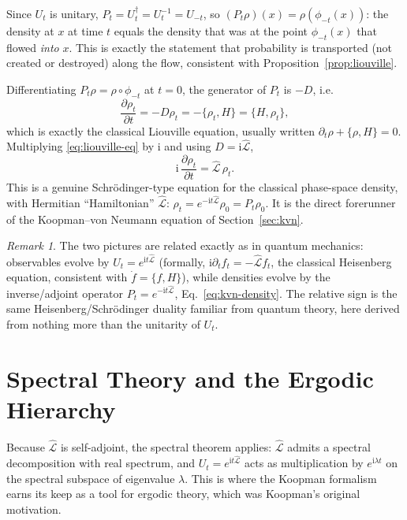 \documentclass[11pt]{article}
\theoremstyle{remark}
\newtheorem{remark}[proposition]{Remark}
\newcommand{\PB}[2]{\{#1,#2\}}
\newcommand{\CL}{\widehat{\mathcal{L}}}
\newcommand{\ii}{\mathrm{i}}
\begin{document}
Since $U_t$ is unitary, $P_t = U_t^\dagger = U_t^{-1}=U_{-t}$, so $(P_t\rho)(x) = \rho(\phi_{-t}(x))$: the density at $x$ at time $t$ equals the density that was at the point $\phi_{-t}(x)$ that flowed \emph{into} $x$. This is exactly the statement that probability is transported (not created or destroyed) along the flow, consistent with Proposition~\ref{prop:liouville}.

Differentiating $P_t\rho = \rho\circ\phi_{-t}$ at $t=0$, the generator of $P_t$ is $-D$, i.e.
\begin{equation}
\frac{\partial \rho_t}{\partial t} = -D\rho_t = -\PB{\rho_t}{H} = \PB{H}{\rho_t},
\label{eq:liouville-eq}
\end{equation}
which is exactly the classical Liouville equation, usually written $\partial_t\rho+\PB{\rho}{H}=0$. Multiplying \eqref{eq:liouville-eq} by $\ii$ and using $D=\ii\CL$,
\begin{equation}
\boxed{\ \ii\,\frac{\partial \rho_t}{\partial t} = \CL\,\rho_t. \ }
\label{eq:kvn-density}
\end{equation}
This is a genuine Schr\"odinger-type equation for the classical phase-space density, with Hermitian ``Hamiltonian'' $\CL$: $\rho_t = e^{-\ii t \CL}\rho_0 = P_t\rho_0$. It is the direct forerunner of the Koopman--von Neumann equation of Section~\ref{sec:kvn}.

\begin{remark}
The two pictures are related exactly as in quantum mechanics: observables evolve by $U_t=e^{\ii t\CL}$ (formally, $\ii\partial_tf_t = -\CL f_t$, the classical Heisenberg equation, consistent with $\dot f=\PB{f}{H}$), while densities evolve by the inverse/adjoint operator $P_t=e^{-\ii t\CL}$, Eq.~\eqref{eq:kvn-density}. The relative sign is the same Heisenberg/Schr\"odinger duality familiar from quantum theory, here derived from nothing more than the unitarity of $U_t$.
\end{remark}

\section{Spectral Theory and the Ergodic Hierarchy}
\label{sec:spectral}

Because $\CL$ is self-adjoint, the spectral theorem applies: $\CL$ admits a spectral decomposition with real spectrum, and $U_t=e^{\ii t\CL}$ acts as multiplication by $e^{\ii\lambda t}$ on the spectral subspace of eigenvalue $\lambda$. This is where the Koopman formalism earns its keep as a tool for ergodic theory, which was Koopman's original motivation.
\end{document}

